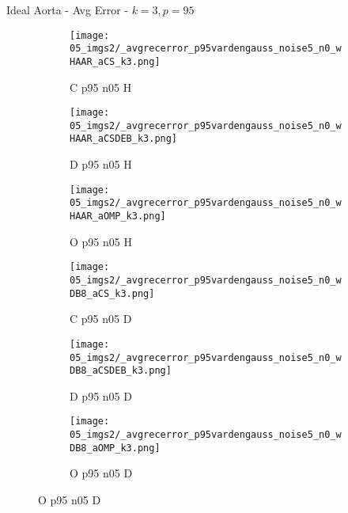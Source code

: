 \begin{frame}{Ideal Aorta - Avg Error - $k=3,p=95$}{}
\begin{figure}
\begin{subfigure}{0.13\textwidth}
\texttt{[image: 05\_imgs2/\_avgrecerror\_p95vardengauss\_noise5\_n0\_wHAAR\_aCS\_k3.png]}
\caption*{\tiny C p95 n05 H}
\end{subfigure}
\begin{subfigure}{0.13\textwidth}
\texttt{[image: 05\_imgs2/\_avgrecerror\_p95vardengauss\_noise5\_n0\_wHAAR\_aCSDEB\_k3.png]}
\caption*{\tiny D p95 n05 H}
\end{subfigure}
\begin{subfigure}{0.13\textwidth}
\texttt{[image: 05\_imgs2/\_avgrecerror\_p95vardengauss\_noise5\_n0\_wHAAR\_aOMP\_k3.png]}
\caption*{\tiny O p95 n05 H}
\end{subfigure}
\begin{subfigure}{0.13\textwidth}
\texttt{[image: 05\_imgs2/\_avgrecerror\_p95vardengauss\_noise5\_n0\_wDB8\_aCS\_k3.png]}
\caption*{\tiny C p95 n05 D}
\end{subfigure}
\begin{subfigure}{0.13\textwidth}
\texttt{[image: 05\_imgs2/\_avgrecerror\_p95vardengauss\_noise5\_n0\_wDB8\_aCSDEB\_k3.png]}
\caption*{\tiny D p95 n05 D}
\end{subfigure}
\begin{subfigure}{0.13\textwidth}
\texttt{[image: 05\_imgs2/\_avgrecerror\_p95vardengauss\_noise5\_n0\_wDB8\_aOMP\_k3.png]}
\caption*{\tiny O p95 n05 D}
\end{subfigure}

\vspace{5pt}


\end{figure}
\end{frame}
